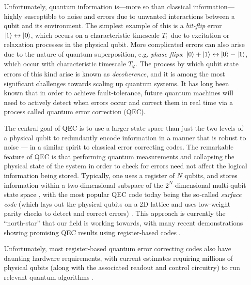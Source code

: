 Unfortunately, quantum information is---more so than classical information---highly susceptible to noise and errors due to unwanted interactions between a qubit and its environment. The simplest example of this is a \textit{bit-flip} error $\lvert1\rangle \leftrightarrow \lvert0\rangle$, which occurs on a characteristic timescale $T_1$ due to excitation or relaxation processes in the physical qubit. More complicated errors can also arise due to the nature of quantum superposition, e.g. \textit{phase flips}: $\lvert0\rangle + \lvert1\rangle \leftrightarrow \lvert0\rangle - \lvert1\rangle$, which occur with characteristic timescale $T_\varphi$. The process by which qubit state errors of this kind arise is known as \textit{decoherence}, and it is among the most significant challenges towards scaling up quantum systems. It has long been known that in order to achieve fault-tolerance, future quantum machines will need to actively detect when errors occur and correct them in real time via a process called quantum error correction (QEC). 

The central goal of QEC is to use a larger state space than just the two levels of a physical qubit to redundantly encode information in a manner that is robust to noise --- in a similar spirit to classical error correcting codes.
The remarkable feature of QEC is that performing quantum measurements and collapsing the physical state of the system in order to check for errors need not affect the logical information being stored. Typically, one uses a register of $N$ qubits, and stores information within a two-dimensional subspace of the $2^N$-dimensional multi-qubit state space \cite{shor1995scheme, steane1996error, gottesman1996class, kitaev2003fault, fowler2012surface}, with the most popular QEC code today being the so-called \textit{surface code} (which lays out the physical qubits on a 2D lattice and uses low-weight parity checks to detect and correct errors) \cite{fowler2012surface}. This approach is currently the ``north-star'' that our field is working towards, with many recent demonstrations showing promising QEC results using register-based codes \cite{google2023suppressing, bluvstein2024logical}. 

Unfortunately, most register-based quantum error correcting codes also have daunting hardware requirements, with current estimates requiring millions of physical qubits (along with the associated readout and control circuitry) to run relevant quantum algorithms \cite{gidney2021factor}. 

